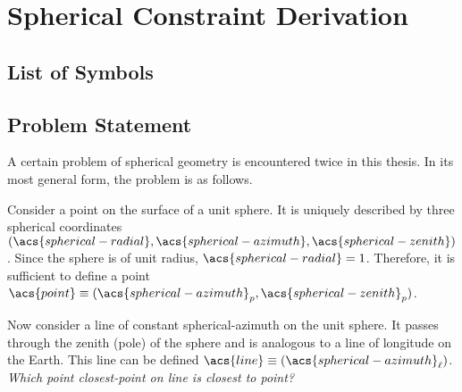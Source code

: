 \chapter{Spherical Constraint Derivation}\label{derivation}
\section*{List of Symbols}
\printacronyms[heading=none,include=math]
\section*{Problem Statement}
A certain problem of spherical geometry is encountered twice in this thesis. In its most general form, the problem is as follows. 

Consider a point on the surface of a unit sphere. It is uniquely described by three spherical coordinates $(\acs{spherical-radial},\acs{spherical-azimuth},\acs{spherical-zenith})$. Since the sphere is of unit radius, $\acs{spherical-radial}=1$. Therefore, it is sufficient to define a point $\acs{point}\equiv(\acs{spherical-azimuth}_p,\acs{spherical-zenith}_p)$.

Now consider a line of constant \acs{spherical-azimuth} on the unit sphere. It passes through the zenith (pole) of the sphere and is analogous to a line of longitude on the Earth. This line can be defined $\acs{line}\equiv(\acs{spherical-azimuth}_\ell)$. \emph{Which point \acs{closest-point} on \acs{line} is closest to \acs{point}?}

